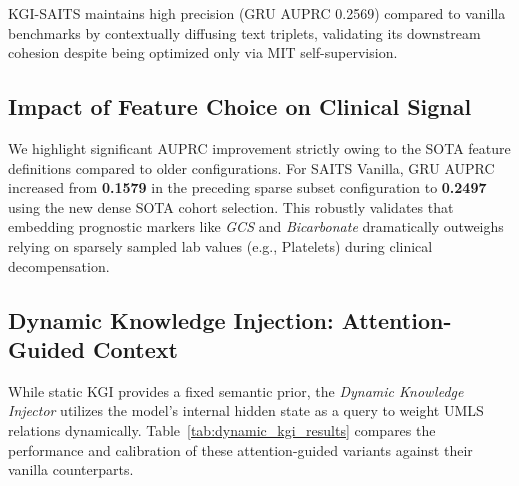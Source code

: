 KGI-SAITS maintains high precision (GRU AUPRC 0.2569) compared to vanilla benchmarks by contextually diffusing text triplets, validating its downstream cohesion despite being optimized only via MIT self-supervision.

\subsection{Impact of Feature Choice on Clinical Signal}
We highlight significant AUPRC improvement strictly owing to the SOTA feature definitions compared to older configurations. For SAITS Vanilla, GRU AUPRC increased from \textbf{0.1579} in the preceding sparse subset configuration to \textbf{0.2497} using the new dense SOTA cohort selection. This robustly validates that embedding prognostic markers like \textit{GCS} and \textit{Bicarbonate} dramatically outweighs relying on sparsely sampled lab values (e.g., Platelets) during clinical decompensation.

\subsection{Dynamic Knowledge Injection: Attention-Guided Context}
While static KGI provides a fixed semantic prior, the \textit{Dynamic Knowledge Injector} utilizes the model's internal hidden state as a query to weight UMLS relations dynamically. Table~\ref{tab:dynamic_kgi_results} compares the performance and calibration of these attention-guided variants against their vanilla counterparts.

\begin{table}[htbp]
\centering
\caption{Comparative performance of Vanilla and DynamicKGI variants on the decompensation task (SOTA subset). KGI-Gain measures reliance on knowledge via inference-time ablation.}
\label{tab:dynamic_kgi_results}
\end{table}

